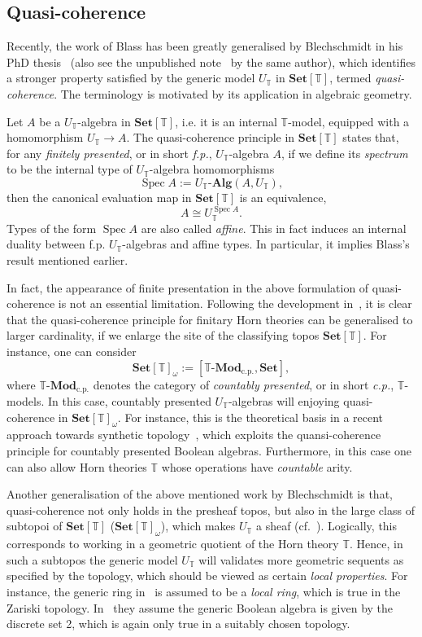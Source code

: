\documentclass[12pt]{amsart}
\theoremstyle{definition}
\newcommand{\mb}[1]{\mathbf{#1}}
\newcommand{\mbb}[1]{\mathbb{#1}}
\newcommand{\T}{\mbb T}
\newcommand{\mr}[1]{\mathrm{#1}}
\newcommand{\Set}{\mb{Set}}
\newcommand{\alg}{\text{-}\mb{Alg}}
\newcommand{\cp}{_{\mr{c.p.}}}
\newcommand{\mmod}[1]{#1\text{-}\mathbf{Mod}}
\newcommand{\spec}{\operatorname{Spec}}
\begin{document}
\subsection{Quasi-coherence}\label{subsec:qc}

Recently, the work of Blass has been greatly generalised by Blechschmidt in his PhD thesis~\cite{blechschmidt2021using} (also see the unpublished note~\cite{blechschmidt2020general} by the same author), which identifies a stronger property satisfied by the generic model $U_\T$ in $\Set[\T]$, termed \emph{quasi-coherence}. The terminology is motivated by its application in algebraic geometry.

Let $A$ be a $U_\T$-algebra in $\Set[\T]$, i.e. it is an internal $\T$-model, equipped with a homomorphism $U_\T \to A$. The quasi-coherence principle in $\Set[\T]$ states that, for any \emph{finitely presented}, or in short \emph{f.p.}, $U_\T$-algebra $A$, if we define its \emph{spectrum} to be the internal type of $U_\T$-algebra homomorphisms
\[ \spec A := U_\T\alg(A,U_\T), \]
then the canonical evaluation map in $\Set[\T]$ is an equivalence,
\[ A \cong U_\T^{\spec A}. \]
Types of the form $\spec A$ are also called \emph{affine}. This in fact induces an internal duality between f.p. $U_\T$-algebras and affine types. In particular, it implies Blass's result mentioned earlier. 

In fact, the appearance of finite presentation in the above formulation of quasi-coherence is not an essential limitation. Following the development in~\cite{blechschmidt2021using,blechschmidt2020general}, it is clear that the quasi-coherence principle for finitary Horn theories can be generalised to larger cardinality, if we enlarge the site of the classifying topos $\Set[\T]$. For instance, one can consider
\[ \Set[\T]_\omega := [\mmod\T\cp,\Set], \]
where $\mmod\T\cp$ denotes the category of \emph{countably presented}, or in short \emph{c.p.}, $\T$-models. In this case, countably presented $U_\T$-algebras will enjoying quasi-coherence in $\Set[\T]_\omega$. For instance, this is the theoretical basis in a recent approach towards synthetic topology~\cite{cherubini2024foundation}, which exploits the quansi-coherence principle for countably presented Boolean algebras. Furthermore, in this case one can also allow Horn theories $\T$ whose operations have \emph{countable} arity.

Another generalisation of the above mentioned work by Blechschmidt is that, quasi-coherence not only holds in the presheaf topos, but also in the large class of subtopoi of $\Set[\T]$ ($\Set[\T]_\omega$), which makes $U_\T$ a sheaf (cf.~\cite[Cor. 7.7]{blechschmidt2020general}). Logically, this corresponds to working in a geometric quotient of the Horn theory $\T$. Hence, in such a subtopos the generic model $U_\T$ will validates more geometric sequents as specified by the topology, which should be viewed as certain \emph{local properties}. For instance, the generic ring in~\cite{Cherubini_Coquand_Hutzler_2024} is assumed to be a \emph{local ring}, which is true in the Zariski topology. In~\cite{cherubini2024foundation} they assume the generic Boolean algebra is given by the discrete set 2, which is again only true in a suitably chosen topology.
\end{document}
